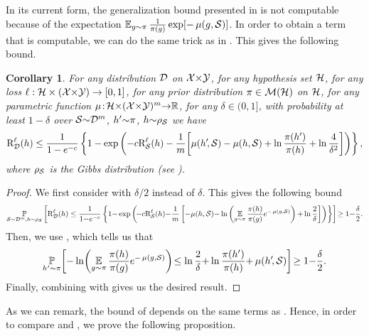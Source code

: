 \documentclass[twoside]{article}
\theoremstyle{plain}
\newtheorem{corollary}[theorem]{Corollary}
\begin{document}
In its current form, the generalization bound presented in  is not computable because of the expectation $\EE_{g\sim\P} \frac{1}{\P(g)}\exp[-\comp(g, \Scal)]$.
In order to obtain a term that is computable, we can do the same trick as in .
This gives the following bound.
\begin{corollary}\label{corollary:disintegrated-catoni}
For any distribution $\Dcal$ on $\Xcal{\times}\Ycal$, for any hypothesis set $\Hcal$, for any loss $\loss : \Hcal\times(\Xcal{\times}\Ycal) \to [0,1]$, for any prior distribution $\P\in\Mcal(\Hcal)$ on $\Hcal$, for any parametric function $\comp\!:\! \Hcal{\times}(\Xcal{\times}\Ycal)^m{\to}\R$, for any $\delta\!\in\!(0,1]$, with probability at least $1{-}\delta$ over $\Scal{\sim}\Dcal^m$, $h'{\sim}\P$, $h{\sim}\AQ$ we have
\begin{align*}
\RiskLoss_{\Dcal}(h) \le \frac{1}{1-e^{-c}}\LC1-\exp\LP -c\RiskLoss_{\Scal}(h) - \frac{1}{m}\!\LB\comp(h'\!,\Scal) - \comp(h,\Scal) +\ln\frac{\P(h')}{\P(h)} + \ln\frac{4}{\delta^2}\RB\RP\RC,
\end{align*}
where $\AQ$ is the Gibbs distribution (see ).
\end{corollary}
\begin{proof}
We first consider  with $\delta/2$ instead of $\delta$.
This gives the following bound
\begin{align}
\PP_{\Scal\sim\Dcal^m,h\sim\AQ}\LB\RiskLoss_{\Dcal}(h) \le \frac{1}{1{-}e^{-c}}\LC1{-}\exp\LP\!-c\RiskLoss_{\Scal}(h){-}\frac{1}{m}\LB-\!\comp(h, \Scal){-}\ln\LP\EE_{g\sim\P} \frac{\P(h)}{\P(g)}e^{-\comp(g, \Scal)}\RP{+}\ln\frac{2}{\delta}\RB\RP\RC\RB\!\ge1{-}\frac{\delta}{2}.\label{eq:proof-disintegrated-catoni-original-1}
\end{align}
Then, we use , which tells us that 
\begin{align*}
    \PP_{h'\sim\P}\!\LB -\ln\!\LP\EE_{g\sim\P}\frac{\P(h)}{\P(g)}e^{-\comp(g, \Scal)}\RP \!\le \ln\frac{2}{\delta}{+}\ln\frac{\P(h')}{\P(h)}{+}\comp(h'\!, \Scal) \RB\! \ge 1{-}\frac{\delta}{2}.
\end{align*}
Finally, combining  with  gives us the desired result.
\end{proof}

As we can remark, the bound of  depends on the same terms as .
Hence, in order to compare  and , we prove the following proposition.
\end{document}
